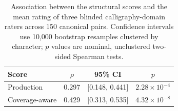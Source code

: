 \begin{table}[t]
\caption{Association between the structural scores and the mean rating of
three blinded calligraphy-domain raters across 150 canonical pairs.
Confidence intervals
use 10,000 bootstrap resamples clustered by character; \(p\) values are
nominal, unclustered two-sided Spearman tests.}
\label{tab:human-validation}
\centering
\scriptsize
\setlength{\tabcolsep}{3pt}
\begin{tabular}{lccc}
\toprule
Score & \(\rho\) & 95\% CI & \(p\) \\
\midrule
Production & 0.297 & [0.148, 0.441] & \(2.28\times10^{-4}\) \\
Coverage-aware & 0.429 & [0.313, 0.535] & \(4.32\times10^{-8}\) \\
\bottomrule
\end{tabular}
\end{table}
